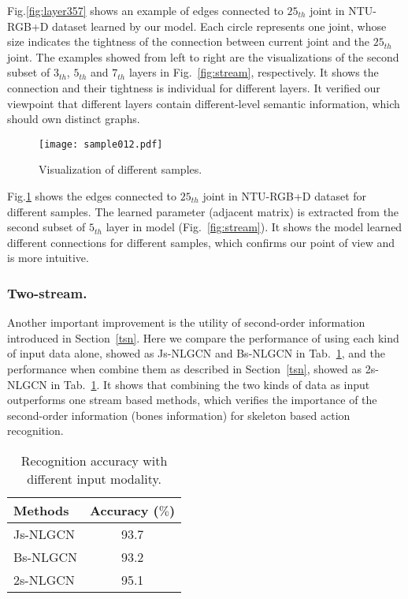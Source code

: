 \documentclass[10pt,twocolumn,letterpaper]{article}
\begin{document}
	Fig.\ref{fig:layer357} shows an example of edges connected to $25_{th}$ joint in NTU-RGB+D dataset learned by our model. Each circle represents one joint, whose size indicates the tightness of the connection between current joint and the $25_{th}$ joint. The examples showed from left to right are the visualizations of the second subset of $3_{th}$, $5_{th}$ and $7_{th}$ layers in Fig.~\ref{fig:stream}, respectively. It shows the connection and their tightness is individual for different layers. It verified our viewpoint that different layers contain different-level semantic information, which should own distinct graphs.
    
	\begin{figure}[!htb]
	\begin{center}
	\texttt{[image: sample012.pdf]}
	\caption{Visualization of different samples.}
	\label{fig:sample012}
	\end{center}
	\end{figure}
    
    Fig.\ref{fig:sample012} shows the edges connected to $25_{th}$ joint in NTU-RGB+D dataset for different samples. The learned parameter (adjacent matrix) is extracted from the second subset of $5_{th}$ layer in model (Fig.~\ref{fig:stream}). It shows the model learned different connections for different samples, which  confirms our point of view and is more intuitive.
    
    
    \subsubsection{Two-stream.}
    Another important improvement is the utility of second-order information introduced in Section~\ref{tsn}. Here we compare the performance of using each kind of input data alone, showed as Js-NLGCN and Bs-NLGCN in Tab.~\ref{tab:twostream}, and the performance when combine them as described in Section~\ref{tsn}, showed as 2s-NLGCN in Tab.~\ref{tab:twostream}.
It shows that combining the two kinds of data as input outperforms one stream based methods, which verifies the importance of the second-order information (bones information) for skeleton based action recognition.


    \begin{table}[htb]
		\label{tab:twostream}
		\begin{center}
		\begin{tabular}{lc}
			\hline
			Methods     & Accuracy ($\%$)    \\
			\hline
			Js-NLGCN & 93.7       \\
			Bs-NLGCN & 93.2       \\
            2s-NLGCN & 95.1        \\
			\hline
		\end{tabular}
		\end{center}
        \caption{Recognition accuracy with different input modality.}
	\end{table}
   
\end{document}
